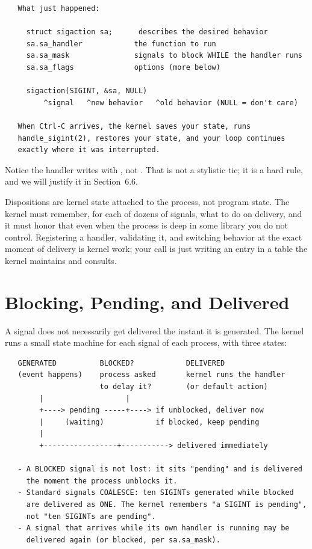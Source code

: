 \begin{verbatim}
   What just happened:

     struct sigaction sa;      describes the desired behavior
     sa.sa_handler            the function to run
     sa.sa_mask               signals to block WHILE the handler runs
     sa.sa_flags              options (more below)

     sigaction(SIGINT, &sa, NULL)
         ^signal   ^new behavior   ^old behavior (NULL = don't care)

   When Ctrl-C arrives, the kernel saves your state, runs
   handle_sigint(2), restores your state, and your loop continues
   exactly where it was interrupted.
\end{verbatim}

Notice the handler writes with , not .
That is not a stylistic tic; it is a hard rule, and we will justify it
in Section~6.6.

\begin{osconcept}
Dispositions are kernel state attached to the process, not program
state. The kernel must remember, for each of dozens of signals, what to
do on delivery, and it must honor that even when the process is deep in
some library you do not control. Registering a handler, validating it,
and switching behavior at the exact moment of delivery is kernel work;
your  call is just writing an entry in a table the
kernel maintains and consults.
\end{osconcept}

\section{Blocking, Pending, and Delivered}

A signal does not necessarily get delivered the instant it is
generated. The kernel runs a small state machine for each signal of
each process, with three states:

\begin{verbatim}
   GENERATED          BLOCKED?            DELIVERED
   (event happens)    process asked       kernel runs the handler
                      to delay it?        (or default action)
        |                   |
        +----> pending -----+----> if unblocked, deliver now
        |     (waiting)            if blocked, keep pending
        |
        +-----------------+-----------> delivered immediately

   - A BLOCKED signal is not lost: it sits "pending" and is delivered
     the moment the process unblocks it.
   - Standard signals COALESCE: ten SIGINTs generated while blocked
     are delivered as ONE. The kernel remembers "a SIGINT is pending",
     not "ten SIGINTs are pending".
   - A signal that arrives while its own handler is running may be
     delivered again (or blocked, per sa.sa_mask).
\end{verbatim}

